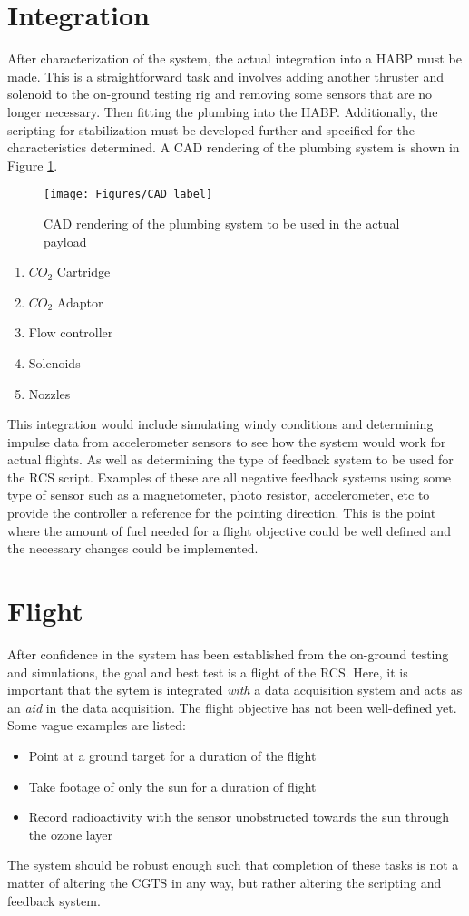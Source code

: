 \section{Integration}
After characterization of the system, the actual integration into a HABP must be made. This is a straightforward task and involves adding another thruster and solenoid to the on-ground testing rig and removing some sensors that are no longer necessary. Then fitting the plumbing into the HABP. Additionally, the scripting for stabilization must be developed further and specified for the characteristics determined. A CAD rendering of the plumbing system is shown in Figure \ref{fig:CAD}.
\begin{figure}[h!]
\centering
\texttt{[image: Figures/CAD\_label]}
\caption{CAD rendering of the plumbing system to be used in the actual payload}
\label{fig:CAD}
\end{figure}
\begin{enumerate}
\item $CO_2$ Cartridge
\item $CO_2$ Adaptor
\item Flow controller
\item Solenoids
\item Nozzles
\end{enumerate}
This integration would include simulating windy conditions and determining impulse data from accelerometer sensors to see how the system would work for actual flights. As well as determining the type of feedback system to be used for the RCS script. Examples of these are all negative feedback systems using some type of sensor such as a magnetometer, photo resistor, accelerometer, etc to provide the controller a reference for the pointing direction. This is the point where the amount of fuel needed for a flight objective could be well defined and the necessary changes could be implemented.
\section{Flight}
After confidence in the system has been established from the on-ground testing and simulations, the goal and best test is a flight of the RCS. Here, it is important that the sytem is integrated \textit{with} a data acquisition system and acts as an \textit{aid} in the data acquisition. The flight objective has not been well-defined yet. Some vague examples are listed:
\begin{itemize}
\item Point at a ground target for a duration of the flight
\item Take footage of only the sun for a duration of flight
\item Record radioactivity with the sensor unobstructed towards the sun through the ozone layer
\end{itemize}
The system should be robust enough such that completion of these tasks is not a matter of altering the CGTS in any way, but rather altering the scripting and feedback system. 